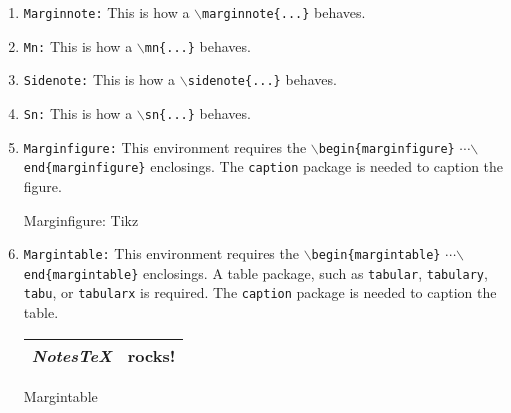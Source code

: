 \begin{enumerate}
  \item \texttt{Marginnote:} This is how a \texttt{$\backslash$marginnote\{...\}} behaves.
  \item \texttt{Mn:} This is how a \texttt{$\backslash$mn\{...\}} behaves.
  \item \texttt{Sidenote:} This is how a \texttt{$\backslash$sidenote\{...\}} behaves.
  \item \texttt{Sn:} This is how a \texttt{$\backslash$sn\{...\}} behaves.
  \item \texttt{Marginfigure:} This environment requires the \texttt{$\backslash$begin\{marginfigure\}} {$\cdots$}\newline\texttt{$\backslash$end\{marginfigure\}} enclosings. The \texttt{caption} package is needed to caption the figure.
  \begin{marginfigure}
  \begin{center}
  \end{center}
  \caption{Marginfigure: Tikz}
  \end{marginfigure}%
  \item \texttt{Margintable:} This environment requires the \texttt{$\backslash$begin\{margintable\}} {$\cdots$}\newline\texttt{$\backslash$end\{margintable\}} enclosings. A table package, such as \texttt{tabular}, \texttt{tabulary}, \texttt{tabu}, or \texttt{tabularx} is required. The \texttt{caption} package is needed to caption the table.
  \begin{margintable}
    \vspace{.1in}
    \begin{tabularx}{\marginparwidth}{|X|X|}
    \hline
    \textit{NotesTeX} & \textbf{rocks!}\\
    \hline
    \end{tabularx}
    \caption{Margintable}
  \end{margintable}
\end{enumerate}

